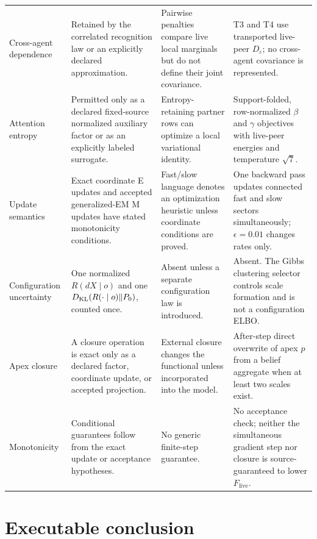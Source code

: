 \begin{longtable}{>{\raggedright\arraybackslash}p{}>{\raggedright\arraybackslash}p{}>{\raggedright\arraybackslash}p{}>{\raggedright\arraybackslash}p{}}
Cross-agent dependence & Retained by the correlated recognition law or an explicitly declared approximation. & Pairwise penalties compare live local marginals but do not define their joint covariance. & T3 and T4 use transported live-peer $D_\varepsilon$; no cross-agent covariance is represented. \\
Attention entropy & Permitted only as a declared fixed-source normalized auxiliary factor or as an explicitly labeled surrogate. & Entropy-retaining partner rows can optimize a local variational identity. & Support-folded, row-normalized $\beta$ and $\gamma$ objectives with live-peer energies and temperature $\sqrt7$. \\
Update semantics & Exact coordinate E updates and accepted generalized-EM M updates have stated monotonicity conditions. & Fast/slow language denotes an optimization heuristic unless coordinate conditions are proved. & One backward pass updates connected fast and slow sectors simultaneously; $\epsilon=0.01$ changes rates only. \\
Configuration uncertainty & One normalized $R(dX\mid o)$ and one $D_{\mathrm{KL}}(R(\mathord\cdot\mid o)\Vert P_0)$, counted once. & Absent unless a separate configuration law is introduced. & Absent. The Gibbs clustering selector controls scale formation and is not a configuration ELBO. \\
Apex closure & A closure operation is exact only as a declared factor, coordinate update, or accepted projection. & External closure changes the functional unless incorporated into the model. & After-step direct overwrite of apex $p$ from a belief aggregate when at least two scales exist. \\
Monotonicity & Conditional guarantees follow from the exact update or acceptance hypotheses. & No generic finite-step guarantee. & No acceptance check; neither the simultaneous gradient step nor closure is source-guaranteed to lower $F_{\mathrm{live}}$. \\
\bottomrule
\end{longtable}

\section{Executable conclusion}


